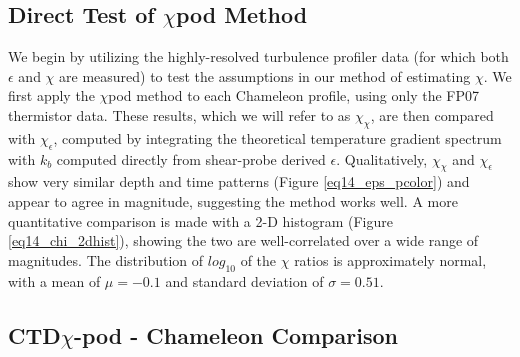 \documentclass{ametsoc}
\begin{document}
\subsection{Direct Test of $\chi$pod Method}

We begin by utilizing the highly-resolved turbulence profiler data (for which both $\epsilon$ and $\chi$ are measured) to test the assumptions in our method of estimating $\chi$. We first apply the $\chi$pod method to each Chameleon profile, using only the FP07 thermistor data. These results, which we will refer to as $\chi_{\chi}$, are then compared with $\chi_{\epsilon}$, computed by integrating the theoretical temperature gradient spectrum with $k_b$ computed directly from shear-probe derived $\epsilon$. Qualitatively, $\chi_{\chi}$ and $\chi_{\epsilon}$ show very similar depth and time patterns (Figure \ref{eq14_eps_pcolor}) and appear to agree in magnitude, suggesting the method works well. A more quantitative comparison is made with a 2-D histogram (Figure \ref{eq14_chi_2dhist}), showing the two are well-correlated over a wide range of magnitudes. The distribution of $log_{10}$ of the $\chi$ ratios is approximately normal, with a mean of $\mu=-0.1$ and standard deviation of $\sigma=0.51$. 



\subsection{ CTD$\chi$-pod - Chameleon Comparison}
\end{document}
